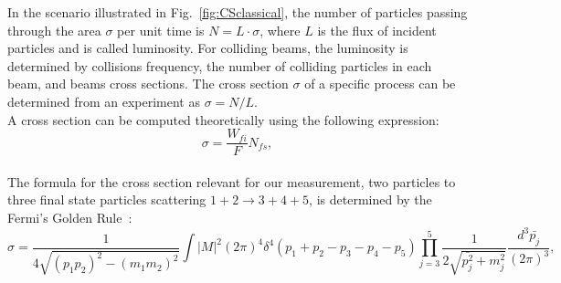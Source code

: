 In the scenario illustrated in Fig.~\ref{fig:CSclassical}, the number of particles passing through the area $\sigma$ per unit time is $N=L \cdot \sigma$, where $L$ is the flux of incident particles and is called luminosity. For colliding beams, the luminosity is determined by collisions frequency, the number of colliding particles in each beam, and beams cross sections. The cross section $\sigma$ of a specific process can be determined from an experiment as $\sigma=N/L$. \\
A cross section can be computed theoretically using the following expression:\\
\begin{equation}
  \sigma = \frac{W_{fi}}{F} N_{fs},
\end{equation}
\\ 
The formula for the cross section relevant for our measurement, two particles to three final state particles scattering $1+2\rightarrow 3+4+5$, is determined by the Fermi's Golden Rule~\cite{ref_Griffiths}: \\
\begin{equation}\label{eq:FermiGoldenRule}
  \sigma = \frac{ 1 }{4\sqrt{(p_1p_2)^2-(m_1m_2)^2}} \int |M|^2 (2\pi)^4 \delta^4(p_1+p_2-p_3-p_4-p_5) \prod_{j=3}^{5} \frac{1}{2 \sqrt{\bar{p_j^2}+m_j^2 }}\frac{d^3\bar{p_j}}{(2\pi)^3},  
\end{equation}
\\ 
